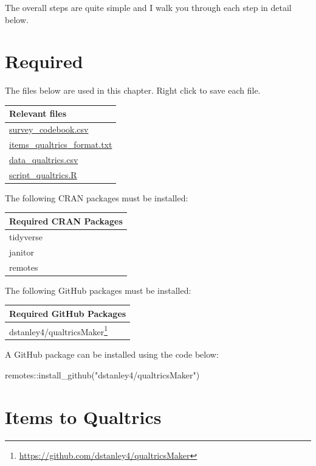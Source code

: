 \documentclass[
]{krantz}
\makeatletter
\newenvironment{Shaded}{\begin{snugshade}}{\end{snugshade}}
\newcommand{\FunctionTok}[1]{\textcolor[rgb]{0,0,0}{#1}}
\newcommand{\NormalTok}[1]{#1}
\newcommand{\SpecialCharTok}[1]{\textcolor[rgb]{0,0,0}{#1}}
\newcommand{\StringTok}[1]{\textcolor[rgb]{0.5,0.5,0.5}{#1}}
\renewcommand{\href}[2]{#2\footnote{\url{#1}}}
\newenvironment{kframe}{%
\medskip{}
\setlength{\fboxsep}{.8em}
 \def\at@end@of@kframe{}%
 \ifinner\ifhmode%
  \def\at@end@of@kframe{\end{minipage}}%
  \begin{minipage}{\columnwidth}%
 \fi\fi%
 \def\FrameCommand##1{\hskip\@totalleftmargin \hskip-\fboxsep
 \colorbox{shadecolor}{##1}\hskip-\fboxsep
     \hskip-\linewidth \hskip-\@totalleftmargin \hskip\columnwidth}%
 \MakeFramed {\advance\hsize-\width
   \@totalleftmargin\z@ \linewidth\hsize
   \@setminipage}}%
 {\par\unskip\endMakeFramed%
 \at@end@of@kframe}
\renewenvironment{Shaded}{\begin{kframe}}{\end{kframe}}
\makeatother
\begin{document}
The overall steps are quite simple and I walk you through each step in detail below.

\hypertarget{required-1}{%
\section{Required}\label{required-1}}

The files below are used in this chapter. Right click to save each file.

\begin{longtable}[]{@{}l@{}}
\toprule
Relevant files \\
\midrule
\endhead
\url{survey_codebook.csv} \\
\url{items_qualtrics_format.txt} \\
\url{data_qualtrics.csv} \\
\url{script_qualtrics.R} \\
\bottomrule
\end{longtable}

The following CRAN packages must be installed:

\begin{longtable}[]{@{}l@{}}
\toprule
Required CRAN Packages \\
\midrule
\endhead
tidyverse \\
janitor \\
remotes \\
\bottomrule
\end{longtable}

The following GitHub packages must be installed:

\begin{longtable}[]{@{}l@{}}
\toprule
Required GitHub Packages \\
\midrule
\endhead
\href{https://github.com/dstanley4/qualtricsMaker}{dstanley4/qualtricsMaker} \\
\bottomrule
\end{longtable}

A GitHub package can be installed using the code below:

\begin{Shaded}
\begin{Highlighting}[]
\NormalTok{remotes}\SpecialCharTok{::}\FunctionTok{install\_github}\NormalTok{(}\StringTok{"dstanley4/qualtricsMaker"}\NormalTok{)}
\end{Highlighting}
\end{Shaded}

\hypertarget{items-to-qualtrics}{%
\section{Items to Qualtrics}\label{items-to-qualtrics}}
\end{document}
